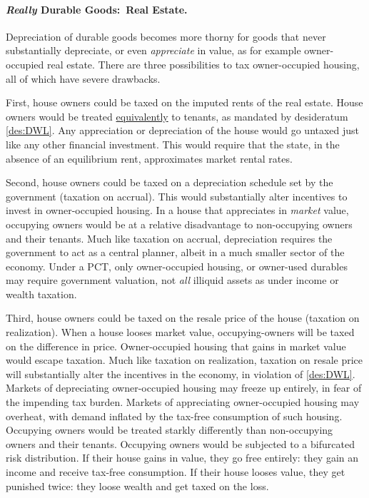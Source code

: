 \paragraph{\emph{Really} Durable Goods:~Real Estate.}
Depreciation of durable goods becomes more thorny for goods that never substantially depreciate, or even \emph{appreciate} in value, as for example owner-occupied real estate.
There are three possibilities to tax owner-occupied housing, all of which have severe drawbacks.

First, house owners could be taxed on the imputed rents of the real estate.
House owners would be treated \hyperref[des:DWL]{equivalently} to tenants, as mandated by desideratum \ref{des:DWL}.
Any appreciation or depreciation of the house would go untaxed just like any other financial investment.
This would require that the state, in the absence of an equilibrium rent, approximates market rental rates.

Second, house owners could be taxed on a depreciation schedule set by the government (taxation on accrual).
This would substantially alter incentives to invest in owner-occupied housing.
In a house that appreciates in \emph{market} value, occupying owners would be at a relative disadvantage to non-occupying owners and their tenants.
Much like taxation on accrual, depreciation requires the government to act as a central planner, albeit in a much smaller sector of the economy.
Under a PCT, only owner-occupied housing, or owner-used durables may require government valuation, not \emph{all} illiquid assets as under income or wealth taxation.

Third, house owners could be taxed on the resale price of the house (taxation on realization).
When a house looses market value, occupying-owners will be taxed on the difference in price.
Owner-occupied housing that gains in market value would escape taxation.
Much like taxation on realization, taxation on resale price will substantially alter the incentives in the economy, in violation of \ref{des:DWL}.
Markets of depreciating owner-occupied housing may freeze up entirely, in fear of the impending tax burden.
Markets of appreciating owner-occupied housing may overheat, with demand inflated by the tax-free consumption of such housing.
Occupying owners would be treated starkly differently than non-occupying owners and their tenants.
Occupying owners would be subjected to a bifurcated risk distribution.
If their house gains in value, they go free entirely:
they gain an income and receive tax-free consumption.
If their house looses value, they get punished twice:
they loose wealth and get taxed on the loss.

